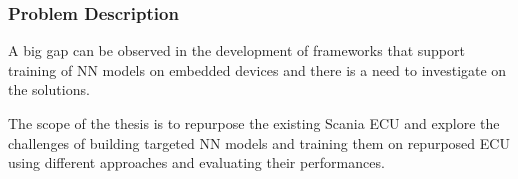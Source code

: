 

\subsubsection{Problem Description}
A big gap can be observed in the development of frameworks that support training of NN models on embedded devices and there is a need to investigate on the solutions. 

The scope of the thesis is to repurpose the existing Scania ECU and explore the challenges of building targeted NN models and training them on repurposed ECU using different approaches and evaluating their performances.




